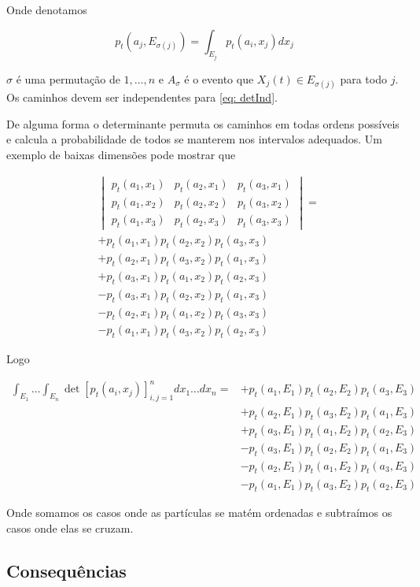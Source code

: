 Onde denotamos

\[
	p_t(a_j, E_{\sigma(j)}) = \int_{E_j} p_t(a_i, x_j) dx_j
\]

$\sigma$ é uma permutação de ${1, \dots, n}$ e $A_{\sigma}$ é o evento que $X_j(t) \in E_{\sigma(j)}$ para todo $j$. Os caminhos devem ser independentes para \eqref{eq: detInd}.

De alguma forma o determinante permuta os caminhos em todas ordens possíveis e calcula a probabilidade de todos se manterem nos intervalos adequados. Um exemplo de baixas dimensões pode mostrar que


\begin{align}
	&
	\begin{vmatrix}
		p_t(a_1, x_1) & p_t(a_2, x_1) & p_t(a_3, x_1) \\
		p_t(a_1, x_2) & p_t(a_2, x_2) & p_t(a_3, x_2) \\
		p_t(a_1, x_3) & p_t(a_2, x_3) & p_t(a_3, x_3)
	\end{vmatrix} =\\
	&
	+ p_t(a_1, x_1) p_t(a_2, x_2) p_t(a_3, x_3)  \\
	&
	+ p_t(a_2, x_1) p_t(a_3, x_2) p_t(a_1, x_3) \\
	&
	+ p_t(a_3, x_1) p_t(a_1, x_2) p_t(a_2, x_3) \\
	& 
	- p_t(a_3, x_1) p_t(a_2, x_2) p_t(a_1, x_3) \\
	&
	-  p_t(a_2, x_1) p_t(a_1, x_2) p_t(a_3, x_3) \\
	&
	- p_t(a_1, x_1) p_t(a_3, x_2) p_t(a_2, x_3)
\end{align}

Logo

\begin{align}
	\int_{E_1} \dots \int_{E_n} \det{[p_t(a_i, x_j)]^{n}_{i,j=1}}  dx_1 \dots dx_n  = 
	&
	+ p_t(a_1, E_1) p_t(a_2, E_2) p_t(a_3, E_3)  \\
	&
	+ p_t(a_2, E_1) p_t(a_3, E_2) p_t(a_1, E_3) \\
	&
	+ p_t(a_3, E_1) p_t(a_1, E_2) p_t(a_2, E_3) \\
	& 
	- p_t(a_3, E_1) p_t(a_2, E_2) p_t(a_1, E_3) \\
	&
	-  p_t(a_2, E_1) p_t(a_1, E_2) p_t(a_3, E_3) \\
	&
	- p_t(a_1, E_1) p_t(a_3, E_2) p_t(a_2, E_3)
\end{align}

Onde somamos os casos onde as partículas se matém ordenadas e subtraímos os casos onde elas se cruzam.


\subsection{Consequências}

